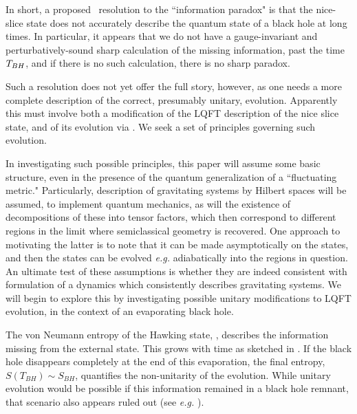 In short, a proposed \QBHB\ resolution to the ``information paradox" is that the nice-slice state does not accurately describe the quantum state of a black hole at long times.  In particular, 
it appears that we do not have a gauge-invariant and perturbatively-sound sharp calculation of the missing information, past the time ${T_{BH}}$, and if there is no such calculation, there is no sharp paradox.

Such a resolution does not yet offer the full story, however, as one needs a more complete description of the correct, presumably unitary, evolution.  Apparently this must involve both a modification of the LQFT description of the nice slice state, and of its evolution via \unitop.  We seek a set of principles governing such evolution.

In investigating such possible principles, this paper will assume some basic structure, even in the presence of the quantum generalization of a ``fluctuating metric."  Particularly, description of gravitating systems by Hilbert spaces will be assumed, to implement quantum mechanics, as will the existence of decompositions of these into tensor factors, which then correspond to different regions in the limit where semiclassical geometry is recovered.  One approach to motivating the latter is to note that it can be made asymptotically on the states, and then the states can be evolved {\it e.g.} adiabatically into the regions in question.  An ultimate test of these assumptions is whether they are indeed consistent with formulation of a dynamics which consistently describes gravitating systems.  We will begin to explore this by investigating possible unitary modifications to LQFT evolution, in the context of an evaporating black hole.





The von Neumann entropy of the Hawking state, \vN, describes the information missing from the external state.  This grows with time as sketched in \entropfig. If the black hole disappears completely at the end of this evaporation, the final entropy, $S(T_{BH})\sim S_{BH}$, quantifies the non-unitarity of the evolution.  While unitary evolution would be possible if this information remained in a black hole remnant, that scenario also appears ruled out (see {\it e.g.}  ).  

